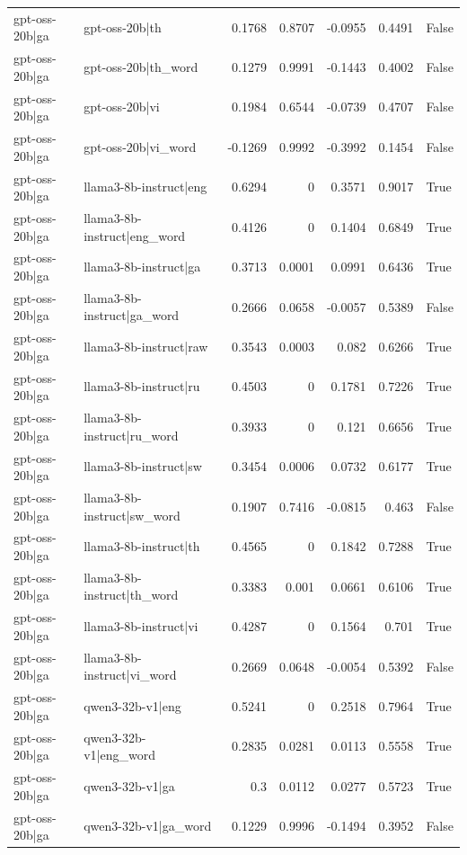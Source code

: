 \begin{table}
\begin{tabular}{l l r r r r l}
gpt-oss-20b|ga & gpt-oss-20b|th & 0.1768 & 0.8707 & -0.0955 & 0.4491 & False \\
gpt-oss-20b|ga & gpt-oss-20b|th_word & 0.1279 & 0.9991 & -0.1443 & 0.4002 & False \\
gpt-oss-20b|ga & gpt-oss-20b|vi & 0.1984 & 0.6544 & -0.0739 & 0.4707 & False \\
gpt-oss-20b|ga & gpt-oss-20b|vi_word & -0.1269 & 0.9992 & -0.3992 & 0.1454 & False \\
gpt-oss-20b|ga & llama3-8b-instruct|eng & 0.6294 & 0 & 0.3571 & 0.9017 & True \\
gpt-oss-20b|ga & llama3-8b-instruct|eng_word & 0.4126 & 0 & 0.1404 & 0.6849 & True \\
gpt-oss-20b|ga & llama3-8b-instruct|ga & 0.3713 & 0.0001 & 0.0991 & 0.6436 & True \\
gpt-oss-20b|ga & llama3-8b-instruct|ga_word & 0.2666 & 0.0658 & -0.0057 & 0.5389 & False \\
gpt-oss-20b|ga & llama3-8b-instruct|raw & 0.3543 & 0.0003 & 0.082 & 0.6266 & True \\
gpt-oss-20b|ga & llama3-8b-instruct|ru & 0.4503 & 0 & 0.1781 & 0.7226 & True \\
gpt-oss-20b|ga & llama3-8b-instruct|ru_word & 0.3933 & 0 & 0.121 & 0.6656 & True \\
gpt-oss-20b|ga & llama3-8b-instruct|sw & 0.3454 & 0.0006 & 0.0732 & 0.6177 & True \\
gpt-oss-20b|ga & llama3-8b-instruct|sw_word & 0.1907 & 0.7416 & -0.0815 & 0.463 & False \\
gpt-oss-20b|ga & llama3-8b-instruct|th & 0.4565 & 0 & 0.1842 & 0.7288 & True \\
gpt-oss-20b|ga & llama3-8b-instruct|th_word & 0.3383 & 0.001 & 0.0661 & 0.6106 & True \\
gpt-oss-20b|ga & llama3-8b-instruct|vi & 0.4287 & 0 & 0.1564 & 0.701 & True \\
gpt-oss-20b|ga & llama3-8b-instruct|vi_word & 0.2669 & 0.0648 & -0.0054 & 0.5392 & False \\
gpt-oss-20b|ga & qwen3-32b-v1|eng & 0.5241 & 0 & 0.2518 & 0.7964 & True \\
gpt-oss-20b|ga & qwen3-32b-v1|eng_word & 0.2835 & 0.0281 & 0.0113 & 0.5558 & True \\
gpt-oss-20b|ga & qwen3-32b-v1|ga & 0.3 & 0.0112 & 0.0277 & 0.5723 & True \\
gpt-oss-20b|ga & qwen3-32b-v1|ga_word & 0.1229 & 0.9996 & -0.1494 & 0.3952 & False \\

\end{tabular}
\end{table}
